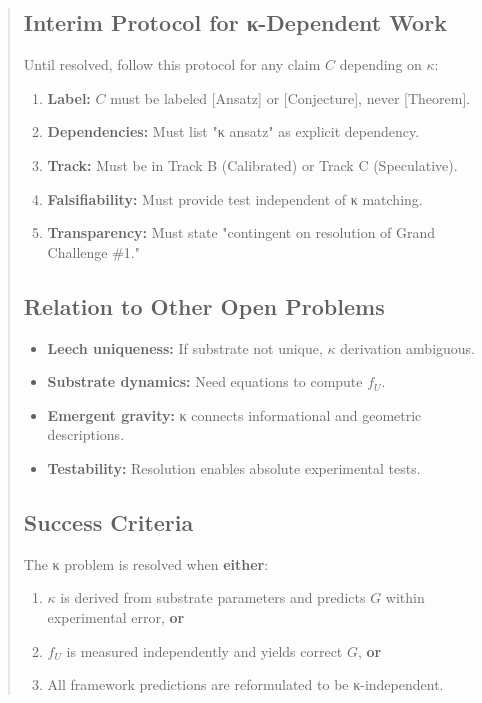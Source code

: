 \documentclass[11pt,titlepage]{article}
\begin{document}
\begin{abstract}
\subsection{Interim Protocol for κ-Dependent Work}

Until resolved, follow this protocol for any claim $C$ depending on $\kappa$:

\begin{tcolorbox}[colback=yellow!5!white,colframe=yellow!75!black,title=Protocol: Handling κ-Dependent Claims]
\begin{enumerate}
\item \textbf{Label:} $C$ must be labeled [Ansatz] or [Conjecture], never [Theorem].
\item \textbf{Dependencies:} Must list "κ ansatz" as explicit dependency.
\item \textbf{Track:} Must be in Track B (Calibrated) or Track C (Speculative).
\item \textbf{Falsifiability:} Must provide test independent of κ matching.
\item \textbf{Transparency:} Must state "contingent on resolution of Grand Challenge \#1."
\end{enumerate}
\end{tcolorbox}

\subsection{Relation to Other Open Problems}

\begin{itemize}
\item \textbf{Leech uniqueness:} If substrate not unique, $\kappa$ derivation ambiguous.
\item \textbf{Substrate dynamics:} Need equations to compute $f_U$.
\item \textbf{Emergent gravity:} κ connects informational and geometric descriptions.
\item \textbf{Testability:} Resolution enables absolute experimental tests.
\end{itemize}

\subsection{Success Criteria}

The κ problem is resolved when \textbf{either}:
\begin{enumerate}
\item $\kappa$ is derived from substrate parameters and predicts $G$ within experimental error, \textbf{or}
\item $f_U$ is measured independently and yields correct $G$, \textbf{or}  
\item All framework predictions are reformulated to be κ-independent.
\end{enumerate}


\end{abstract}
\end{document}
